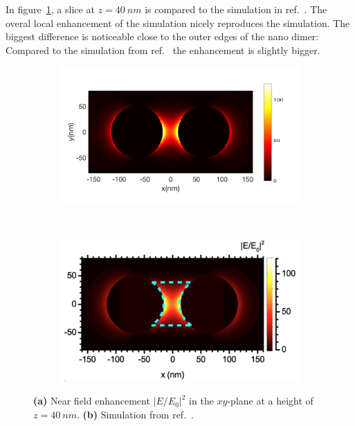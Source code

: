 In figure~\ref{fig:slice-comparision}, a slice at $z=\SI{40}{nm}$ is compared to the simulation in ref.~\cite{heeg}. The overal local enhancement of the simulation nicely reproduces the simulation. The biggest difference is noticeable close to the outer edges of the nano dimer: Compared to the simulation from ref.~\cite{heeg} the enhancement is slightly bigger.

\begin{figure}[!h]
  \centering
  \begin{subfigure}{0.50\textwidth}
    \includegraphics[width=\textwidth]{./images/40nm.png}
  \end{subfigure}
  ~
  \begin{subfigure}{0.40\textwidth}
    \includegraphics[width=\textwidth]{./images/local-enhancement-heeg.png}
  \end{subfigure}
  \caption{\textbf{(a)} Near field enhancement $|E/E_0|^2$ in the $xy$-plane at a height of $z=\SI{40}{nm}$. \textbf{(b)} Simulation from ref.~\cite{heeg}.}
  \label{fig:slice-comparision}
\end{figure}

